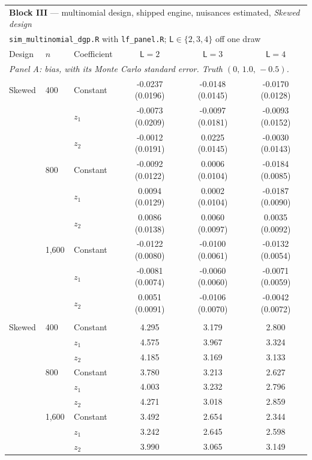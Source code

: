 \begin{tabular}{lllccc}
\toprule
\multicolumn{6}{l}{\textbf{Block III} --- multinomial design, shipped engine, nuisances estimated, \emph{Skewed design}} \\
\multicolumn{6}{l}{\quad \texttt{sim\_multinomial\_dgp.R} with \texttt{lf\_panel.R}; $\mathsf L\in\{2,3,4\}$ off one draw} \\
\midrule
Design & $n$ & Coefficient & $\mathsf L=2$ & $\mathsf L=3$ & $\mathsf L=4$ \\
\midrule
\multicolumn{6}{l}{\textit{Panel A: bias, with its Monte Carlo standard error.  Truth $(0,\,1.0,\,-0.5)$.}} \\
\midrule
Skewed & 400 & Constant & -0.0237 (0.0196) & -0.0148 (0.0145) & -0.0170 (0.0128) \\
 &  & $z_1$ & -0.0073 (0.0209) & -0.0097 (0.0181) & -0.0093 (0.0152) \\
 &  & $z_2$ & -0.0012 (0.0191) & 0.0225 (0.0145) & -0.0030 (0.0143) \\
 & 800 & Constant & -0.0092 (0.0122) & 0.0006 (0.0104) & -0.0184 (0.0085) \\
 &  & $z_1$ & 0.0094 (0.0129) & 0.0002 (0.0104) & -0.0187 (0.0090) \\
 &  & $z_2$ & 0.0086 (0.0138) & 0.0060 (0.0097) & 0.0035 (0.0092) \\
 & 1,600 & Constant & -0.0122 (0.0080) & -0.0100 (0.0061) & -0.0132 (0.0054) \\
 &  & $z_1$ & -0.0081 (0.0074) & -0.0060 (0.0060) & -0.0071 (0.0059) \\
 &  & $z_2$ & 0.0051 (0.0091) & -0.0106 (0.0070) & -0.0042 (0.0072) \\
\addlinespace
\multicolumn{6}{l}{\textit{Panel B: $\sqrt n\times$ s.d., which the theorem makes constant in $n$.}} \\
\midrule
Skewed & 400 & Constant & 4.295 & 3.179 & 2.800 \\
 &  & $z_1$ & 4.575 & 3.967 & 3.324 \\
 &  & $z_2$ & 4.185 & 3.169 & 3.133 \\
 & 800 & Constant & 3.780 & 3.213 & 2.627 \\
 &  & $z_1$ & 4.003 & 3.232 & 2.796 \\
 &  & $z_2$ & 4.271 & 3.018 & 2.859 \\
 & 1,600 & Constant & 3.492 & 2.654 & 2.344 \\
 &  & $z_1$ & 3.242 & 2.645 & 2.598 \\
 &  & $z_2$ & 3.990 & 3.065 & 3.149 \\

\end{tabular}
